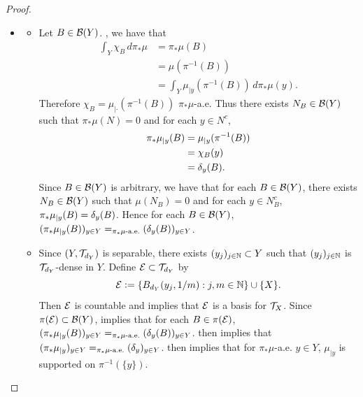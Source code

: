 \documentclass{book}
\begin{document}
\begin{proof}
\begin{itemize}
\begin{align*}
			& = \int \chi_{\pi^{-1}(B)} \chi_A \dmu \\
			& = \int \chi_{A \cap \pi^{-1}(B)} \dmu \\
			& = \mu(A \cap \pi^{-1}(B)).
		\end{align*}
		\item 
		\begin{itemize}
			\item Let $B \in \mathcal{B}(Y)$. , we have that
			\begin{align*}
				\int_Y \chi_B \, d \pi_* \mu
				& = \pi_* \mu(B) \\
				& = \mu(\pi^{-1}(B)) \\
				& = \int_Y \mu_{|y}(\pi^{-1}(B)) \, d \pi_* \mu(y). 
			\end{align*} 
			Therefore $\chi_B = \mu_{| \cdot }(\pi^{-1}(B))$ $\pi_* \mu$-a.e. Thus there exists $N_B \in \mathcal{B}(Y)$ such that $\pi_* \mu(N) = 0$ and for each $y \in N^c$, 
			\begin{align*}
				\pi_* \mu_{| y }(B)
				& = \mu_{| y }(\pi^{-1}(B)) \\
				& = \chi_B(y) \\
				& = \delta_y(B).
			\end{align*}
			Since $B \in \mathcal{B}(Y)$ is arbitrary, we have that for each $B \in \mathcal{B}(Y)$, there exists $N_B \in \mathcal{B}(Y)$ such that $\mu(N_B) = 0$ and for each $y \in N_B^c$, $\pi_* \mu_{| y }(B) = \delta_y(B)$. Hence for each $B \in \mathcal{B}(Y)$, $(\pi_* \mu_{| y }(B))_{y \in Y} =_{\text{$\pi_*\mu$-a.e.}} (\delta_y(B))_{y \in Y}$.
			\item Since $(Y, \mathcal{T}_{d_Y})$ is separable, there exists $(y_j)_{j \in \mathbb{N}} \subset Y$ such that $(y_j)_{j \in \mathbb{N}}$ is $\mathcal{T}_{d_Y}$-dense in $Y$. Define $\mathcal{E} \subset \mathcal{T}_{d_Y}$ by 
			$$\mathcal{E} \vcentcolon= \{ B_{d_Y}(y_j, 1/m): j,m \in \mathbb{N} \} \cup \{X\}.$$
			Then $\mathcal{E}$ is countable and  implies that $\mathcal{E}$ is a basis for $\mathcal{T}_X$. Since $\pi(\mathcal{E}) \subset \mathcal{B}(Y)$,  implies that for each $B \in \pi(\mathcal{E})$, $(\pi_* \mu_{|y}(B))_{y \in Y} =_{\text{$\pi_*\mu$-a.e.}} (\delta_y(B))_{y \in Y}$.  then implies that $(\pi_* \mu_{|y})_{y \in Y} =_{\text{$\pi_*\mu$-a.e.}} (\delta_y)_{y \in Y}$.  then implies that for $\pi_*\mu$-a.e. $y \in Y$, $\mu_{|y}$ is supported on $\pi^{-1}(\{y\})$.
		\end{itemize}
	\end{itemize}
\end{proof}
\end{document}
